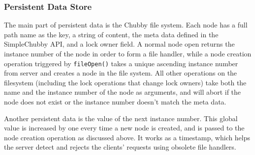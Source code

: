 \subsubsection{Persistent Data Store}

The main part of persistent data is the Chubby file system. Each node has
a full path name as the key, a string of content, the meta data defined
in the SimpleChubby API, and a lock owner field. A normal node open returns
the instance number of the node in order to form a file handler, while
a node creation operation triggered by \texttt{fileOpen()} takes a unique ascending
instance number from server and creates a node in the file system. All other
operations on the filesystem (including the lock operations that change lock owners)
take both the name and the instance number of the node as arguments, and will
abort if the node does not exist or the instance number doesn't match the
meta data.

Another persistent data is the value of the next instance number. This global
value is increased by one every time a new node is created, and is passed
to the node creation operation as discussed above. It works as a timestamp,
which helps the server detect and rejects the clients' requests using obsolete
file handlers.
